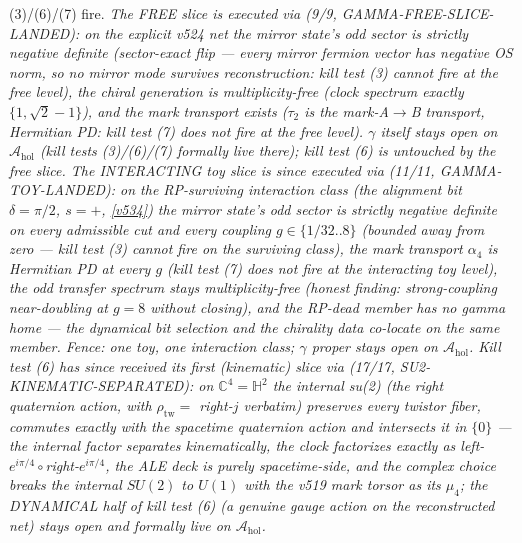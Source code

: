 \documentclass[11pt,a4paper]{article}
\begin{document}
(3)/(6)/(7) fire. \emph{The FREE slice is executed via
 (9/9, GAMMA-FREE-SLICE-LANDED): on the explicit v524 net
the mirror state's odd sector is \emph{strictly negative definite} (sector-exact flip ---
every mirror fermion vector has negative OS norm, so no mirror mode survives reconstruction:
kill test (3) cannot fire at the free level), the chiral generation is multiplicity-free
(clock spectrum exactly $\{1,\sqrt2-1\}$), and the mark transport exists ($\tau_2$ is the
mark-A$\to$B transport, Hermitian PD: kill test (7) does not fire at the free level).
$\gamma$ itself stays open on $\mathcal A_{\mathrm{hol}}$ (kill tests (3)/(6)/(7) formally
live there); kill test (6) is untouched by the free slice.  The INTERACTING toy slice is
since executed via  (11/11, GAMMA-TOY-LANDED): on
the RP-surviving interaction class (the alignment bit $\delta=\pi/2$, $s=+$, \vref{v534})
the mirror state's odd sector is \emph{strictly negative definite} on every admissible cut
and every coupling $g\in\{1/32..8\}$ (bounded away from zero --- kill test (3) cannot fire
on the surviving class), the mark transport $\alpha_4$ is Hermitian PD at every $g$ (kill
test (7) does not fire at the interacting toy level), the odd transfer spectrum stays
multiplicity-free (honest finding: strong-coupling near-doubling at $g=8$ without
closing), and the RP-dead member has no gamma home --- the dynamical bit selection and the
chirality data \emph{co-locate} on the same member.  Fence: one toy, one interaction
class; $\gamma$ proper stays open on $\mathcal A_{\mathrm{hol}}$.  Kill test (6) has since
received its first (kinematic) slice via  (17/17,
SU2-KINEMATIC-SEPARATED): on $\mathbb C^4=\mathbb H^2$ the internal su(2) (the right
quaternion action, with $\rho_{\mathrm{tw}}=$ right-$j$ verbatim) preserves every twistor
fiber, commutes exactly with the spacetime quaternion action and intersects it in $\{0\}$
--- the internal factor \emph{separates} kinematically, the clock factorizes exactly as
left-$e^{i\pi/4}\circ$right-$e^{i\pi/4}$, the ALE deck is purely spacetime-side, and the
complex choice breaks the internal $SU(2)$ to $U(1)$ with the v519 mark torsor as its
$\mu_4$; the DYNAMICAL half of kill test (6) (a genuine gauge action on the reconstructed
net) stays open and formally live on $\mathcal A_{\mathrm{hol}}$.}
\end{document}
